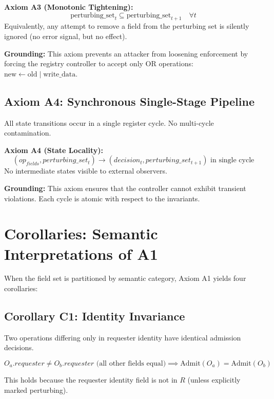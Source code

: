 \documentclass[11pt,oneside]{article}
\begin{document}
\begin{boxed}
\textbf{Axiom A3 (Monotonic Tightening):}
\[
\text{perturbing\_set}_t \subseteq \text{perturbing\_set}_{t+1} \quad \forall t
\]
Equivalently, any attempt to remove a field from the perturbing set is silently ignored (no error signal, but no effect).
\end{boxed}

\textbf{Grounding:} This axiom prevents an attacker from loosening enforcement by forcing the registry controller to accept only OR operations: $\text{new} \gets \text{old} \mid \text{write\_data}$.

\subsection{Axiom A4: Synchronous Single-Stage Pipeline}

All state transitions occur in a single register cycle. No multi-cycle contamination.

\begin{boxed}
\textbf{Axiom A4 (State Locality):}
\[
(op_{fields}, perturbing\_set_t) \to (decision_t, perturbing\_set_{t+1}) \text{ in single cycle}
\]
No intermediate states visible to external observers.
\end{boxed}

\textbf{Grounding:} This axiom ensures that the controller cannot exhibit transient violations. Each cycle is atomic with respect to the invariants.

\section{Corollaries: Semantic Interpretations of A1}

When the field set is partitioned by semantic category, Axiom A1 yields four corollaries:

\subsection{Corollary C1: Identity Invariance}

\begin{boxed}
Two operations differing only in requester identity have identical admission decisions.

\[
O_a.requester \neq O_b.requester \text{ (all other fields equal)} \implies \text{Admit}(O_a) = \text{Admit}(O_b)
\]
\end{boxed}

This holds because the requester identity field is not in $R$ (unless explicitly marked perturbing).
\end{document}
